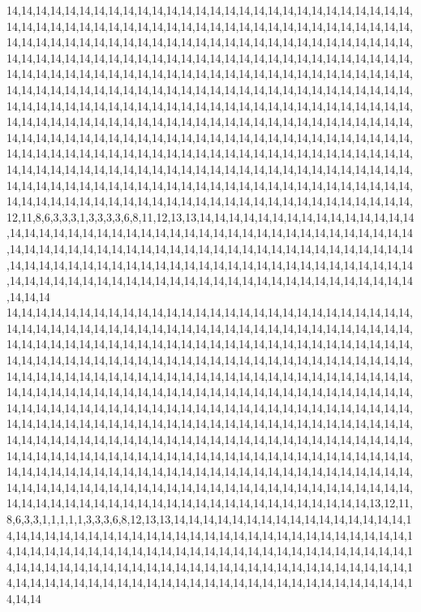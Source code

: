 14,14,14,14,14,14,14,14,14,14,14,14,14,14,14,14,14,14,14,14,14,14,14,14,14,14,14,14,14,14,14,14,14,14,14,14,14,14,14,14,14,14,14,14,14,14,14,14,14,14,14,14,14,14,14,14,14,14,14,14,14,14,14,14,14,14,14,14,14,14,14,14,14,14,14,14,14,14,14,14,14,14,14,14,14,14,14,14,14,14,14,14,14,14,14,14,14,14,14,14,14,14,14,14,14,14,14,14,14,14,14,14,14,14,14,14,14,14,14,14,14,14,14,14,14,14,14,14,14,14,14,14,14,14,14,14,14,14,14,14,14,14,14,14,14,14,14,14,14,14,14,14,14,14,14,14,14,14,14,14,14,14,14,14,14,14,14,14,14,14,14,14,14,14,14,14,14,14,14,14,14,14,14,14,14,14,14,14,14,14,14,14,14,14,14,14,14,14,14,14,14,14,14,14,14,14,14,14,14,14,14,14,14,14,14,14,14,14,14,14,14,14,14,14,14,14,14,14,14,14,14,14,14,14,14,14,14,14,14,14,14,14,14,14,14,14,14,14,14,14,14,14,14,14,14,14,14,14,14,14,14,14,14,14,14,14,14,14,14,14,14,14,14,14,14,14,14,14,14,14,14,14,14,14,14,14,14,14,14,14,14,14,14,14,14,14,14,14,14,14,14,14,14,14,14,14,14,14,14,14,14,14,14,14,14,14,14,14,14,14,14,14,14,14,14,14,14,14,14,14,14,14,14,14,14,14,14,14,14,14,14,14,14,14,14,14,14,14,14,14,14,14,14,14,14,14,14,14,14,14,14,14,14,14,12,11,8,6,3,3,3,1,3,3,3,3,6,8,11,12,13,13,14,14,14,14,14,14,14,14,14,14,14,14,14,14,14,14,14,14,14,14,14,14,14,14,14,14,14,14,14,14,14,14,14,14,14,14,14,14,14,14,14,14,14,14,14,14,14,14,14,14,14,14,14,14,14,14,14,14,14,14,14,14,14,14,14,14,14,14,14,14,14,14,14,14,14,14,14,14,14,14,14,14,14,14,14,14,14,14,14,14,14,14,14,14,14,14,14,14,14,14,14,14,14,14,14,14,14,14,14,14,14,14,14,14,14,14,14,14,14,14,14,14,14,14,14,14,14,14,14,14
14,14,14,14,14,14,14,14,14,14,14,14,14,14,14,14,14,14,14,14,14,14,14,14,14,14,14,14,14,14,14,14,14,14,14,14,14,14,14,14,14,14,14,14,14,14,14,14,14,14,14,14,14,14,14,14,14,14,14,14,14,14,14,14,14,14,14,14,14,14,14,14,14,14,14,14,14,14,14,14,14,14,14,14,14,14,14,14,14,14,14,14,14,14,14,14,14,14,14,14,14,14,14,14,14,14,14,14,14,14,14,14,14,14,14,14,14,14,14,14,14,14,14,14,14,14,14,14,14,14,14,14,14,14,14,14,14,14,14,14,14,14,14,14,14,14,14,14,14,14,14,14,14,14,14,14,14,14,14,14,14,14,14,14,14,14,14,14,14,14,14,14,14,14,14,14,14,14,14,14,14,14,14,14,14,14,14,14,14,14,14,14,14,14,14,14,14,14,14,14,14,14,14,14,14,14,14,14,14,14,14,14,14,14,14,14,14,14,14,14,14,14,14,14,14,14,14,14,14,14,14,14,14,14,14,14,14,14,14,14,14,14,14,14,14,14,14,14,14,14,14,14,14,14,14,14,14,14,14,14,14,14,14,14,14,14,14,14,14,14,14,14,14,14,14,14,14,14,14,14,14,14,14,14,14,14,14,14,14,14,14,14,14,14,14,14,14,14,14,14,14,14,14,14,14,14,14,14,14,14,14,14,14,14,14,14,14,14,14,14,14,14,14,14,14,14,14,14,14,14,14,14,14,14,14,14,14,14,14,14,14,14,14,14,14,14,14,14,14,14,14,14,14,14,14,14,14,14,14,14,14,13,12,11,8,6,3,3,1,1,1,1,1,3,3,3,6,8,12,13,13,14,14,14,14,14,14,14,14,14,14,14,14,14,14,14,14,14,14,14,14,14,14,14,14,14,14,14,14,14,14,14,14,14,14,14,14,14,14,14,14,14,14,14,14,14,14,14,14,14,14,14,14,14,14,14,14,14,14,14,14,14,14,14,14,14,14,14,14,14,14,14,14,14,14,14,14,14,14,14,14,14,14,14,14,14,14,14,14,14,14,14,14,14,14,14,14,14,14,14,14,14,14,14,14,14,14,14,14,14,14,14,14,14,14,14,14,14,14,14,14,14,14,14,14,14,14,14,14,14,14,14
